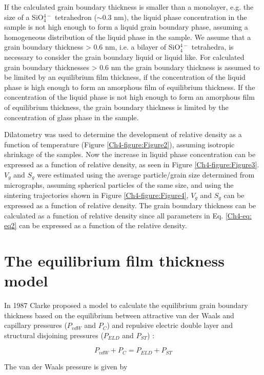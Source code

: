 If the calculated grain boundary thickness is smaller than a monolayer, e.g. the size of a SiO$_{4}^{4-}$ tetrahedron ($\sim$0.3 nm), the liquid phase concentration in the sample is not high enough to form a liquid grain boundary phase, assuming a homogeneous distribution of the liquid phase in the sample. We assume that a grain boundary thickness > 0.6 nm, i.e. a bilayer of SiO$_{4}^{4-}$ tetrahedra, is necessary to consider the grain boundary liquid or liquid like. For calculated grain boundary thicknesses > 0.6 nm the grain boundary thickness is assumed to be limited by an equilibrium film thickness, if the concentration of the liquid phase is high enough to form an amorphous film of equilibrium thickness. If the concentration of the liquid phase is not high enough to form an amorphous film of equilibrium thickness, the grain boundary thickness is limited by the concentration of glass phase in the sample.

Dilatometry was used to determine the development of relative density as a function of temperature (Figure \ref{Ch4-figure:Figure2}), assuming isotropic shrinkage of the samples. Now the increase in liquid phase concentration can be expressed as a function of relative density, as seen in Figure \ref{Ch4-figure:Figure3}. $V_{g}$ and $S_{g}$ were estimated using the average particle/grain size determined from micrographs, assuming spherical particles of the same size, and using the sintering trajectories shown in Figure \ref{Ch4-figure:Figure4}, $V_{g}$ and $S_{g}$ can be expressed as a function of relative density. The grain boundary thickness can be calculated as a function of relative density since all parameters in Eq. \ref{Ch4-eq: eq2} can be expressed as a function of the relative density.

\section{The equilibrium film thickness model}
In 1987 Clarke proposed a model to calculate the equilibrium grain boundary thickness based on the equilibrium between attractive van der Waals and capillary pressures ($P_{vdW}$ and $P_{C}$) and repulsive electric double layer and structural disjoining pressures ($P_{ELD}$ and $P_{ST}$) \cite{Clarke1987,Clarke1993}:

\begin{equation}
\label{Ch4-eq: eq3}
P_{vdW} + P_{C} = P_{ELD} + P_{ST} 
\end{equation}

\noindent The van der Waals pressure is given by

